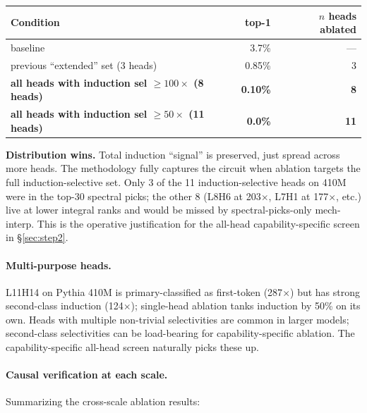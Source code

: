 \documentclass[11pt]{article}
\begin{document}
\begin{center}
\small
\begin{tabular}{lrr}
\toprule
Condition & top-1 & $n$ heads ablated \\
\midrule
baseline & 3.7\% & --- \\
previous ``extended'' set (3 heads) & 0.85\% & 3 \\
\textbf{all heads with induction sel $\geq 100\times$ (8 heads)} & \textbf{0.10\%} & \textbf{8} \\
\textbf{all heads with induction sel $\geq 50\times$ (11 heads)} & \textbf{0.0\%} & \textbf{11} \\
\bottomrule
\end{tabular}
\end{center}

\textbf{Distribution wins.} Total induction ``signal'' is preserved, just spread across more heads. The methodology fully captures the circuit when ablation targets the full induction-selective set. Only 3 of the 11 induction-selective heads on 410M were in the top-30 spectral picks; the other 8 (L8H6 at 203$\times$, L7H1 at 177$\times$, etc.) live at lower integral ranks and would be missed by spectral-picks-only mech-interp. This is the operative justification for the all-head capability-specific screen in \S\ref{sec:step2}.

\paragraph{Multi-purpose heads.} L11H14 on Pythia 410M is primary-classified as first-token (287$\times$) but has strong second-class induction (124$\times$); single-head ablation tanks induction by 50\% on its own. Heads with multiple non-trivial selectivities are common in larger models; second-class selectivities can be load-bearing for capability-specific ablation. The capability-specific all-head screen naturally picks these up.

\paragraph{Causal verification at each scale.} Summarizing the cross-scale ablation results:
\end{document}
